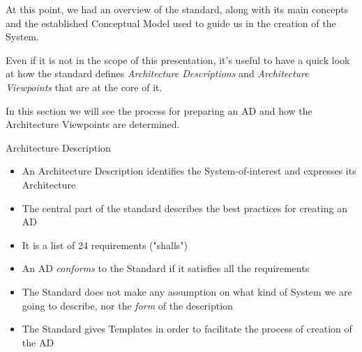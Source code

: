 		
		\begin{frame}
		
		At this point, we had an overview of the standard, along with its main concepts and the established Conceptual Model used to guide us in the creation of the System.
		\newline\newline
		
		Even if it is not in the scope of this presentation, it's useful to have a quick look at how the standard defines \emph{Architecture Descriptions} and \emph{Architecture Viewpoints} that are at the core of it.\newline\newline
		
		In this section we will see the process for preparing an AD and how the Architecture Viewpoints are determined.
		
		\end{frame}
		
		\begin{frame}
			\begin{block}{Architecture Description}
				\begin{itemize}
				\vspace{0.3cm}
					\item An Architecture Description identifies the System-of-interest and expresses its Architecture
					\vspace{0.3cm}
					\item The central part of the standard describes the best practices for creating an AD
\vspace{0.3cm}				
					\item It is a list of 24 requirements ("shalls")
\vspace{0.3cm}				
					\item An AD \emph{conforms} to the Standard if it satisfies all the requirements
\vspace{0.3cm}					
					\item The Standard does not make any assumption on what kind of System we are going to describe, nor the \emph{form} of the description
					\vspace{0.3cm}
					\item The Standard gives Templates in order to facilitate the process of creation of the AD
					\vspace{0.3cm}
				\end{itemize}
			\end{block}
		\end{frame}				
		
